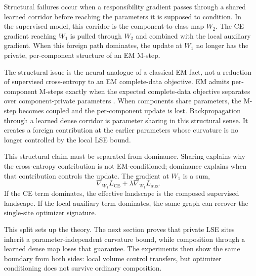 Structural failures occur when a responsibility gradient passes through a
shared learned corridor before reaching the parameters it is supposed to
condition. In the supervised model, this corridor is the component-to-class
map $W_2$. The CE gradient reaching $W_1$ is pulled through $W_2$ and combined
with the local auxiliary gradient. When this foreign path dominates, the
update at $W_1$ no longer has the private, per-component structure of an EM
M-step.

The structural issue is the neural analogue of a classical EM fact, not a
reduction of supervised cross-entropy to an EM complete-data objective. EM
admits per-component M-steps exactly when the expected complete-data objective
separates over component-private parameters
\citep{dempster1977maximum,mclachlan2000finite}. When components share
parameters, the M-step becomes coupled and the per-component update is lost.
Backpropagation through a learned dense corridor is parameter sharing in this
structural sense. It creates a foreign contribution at the earlier parameters
whose curvature is no longer controlled by the local LSE bound.

This structural claim must be separated from dominance. Sharing explains why
the cross-entropy contribution is not EM-conditioned; dominance explains when
that contribution controls the update. The gradient at $W_1$ is a sum,
\[
    \nabla_{W_1}L_{\mathrm{CE}}
    +
    \lambda\nabla_{W_1}L_{\mathrm{aux}}.
\]
If the CE term dominates, the effective landscape is the composed supervised
landscape. If the local auxiliary term dominates, the same graph can recover
the single-site optimizer signature.

This split sets up the theory. The next section proves that private LSE sites
inherit a parameter-independent curvature bound, while composition through a
learned dense map loses that guarantee. The experiments then show the same
boundary from both sides: local volume control transfers, but optimizer
conditioning does not survive ordinary composition.
